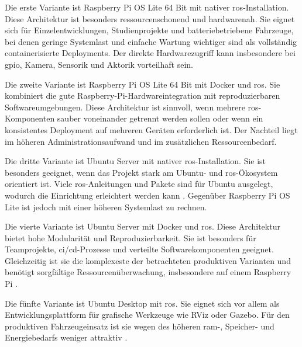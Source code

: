 Die erste Variante ist Raspberry Pi OS Lite 64 Bit mit nativer \gls{ros}-Installation. Diese Architektur ist besonders ressourcenschonend und hardwarenah. Sie eignet sich für Einzelentwicklungen, Studienprojekte und batteriebetriebene Fahrzeuge, bei denen geringe Systemlast und einfache Wartung wichtiger sind als vollständig containerisierte Deployments. Der direkte Hardwarezugriff kann insbesondere bei \gls{gpio}, Kamera, Sensorik und Aktorik vorteilhaft sein.

Die zweite Variante ist Raspberry Pi OS Lite 64 Bit mit Docker und \gls{ros}. Sie kombiniert die gute Raspberry-Pi-Hardwareintegration mit reproduzierbaren Softwareumgebungen. Diese Architektur ist sinnvoll, wenn mehrere \gls{ros}-Komponenten sauber voneinander getrennt werden sollen oder wenn ein konsistentes Deployment auf mehreren Geräten erforderlich ist. Der Nachteil liegt im höheren Administrationsaufwand und im zusätzlichen Ressourcenbedarf.

Die dritte Variante ist Ubuntu Server mit nativer \gls{ros}-Installation. Sie ist besonders geeignet, wenn das Projekt stark am Ubuntu- und \gls{ros}-Ökosystem orientiert ist. Viele \gls{ros}-Anleitungen und Pakete sind für Ubuntu ausgelegt, wodurch die Einrichtung erleichtert werden kann \cite{zotero-item-156}. Gegenüber Raspberry Pi OS Lite ist jedoch mit einer höheren Systemlast zu rechnen.

Die vierte Variante ist Ubuntu Server mit Docker und \gls{ros}. Diese Architektur bietet hohe Modularität und Reproduzierbarkeit. Sie ist besonders für Teamprojekte, \gls{ci/cd}-Prozesse und verteilte Softwarekomponenten geeignet. Gleichzeitig ist sie die komplexeste der betrachteten produktiven Varianten und benötigt sorgfältige Ressourcenüberwachung, insbesondere auf einem Raspberry Pi \cite{gamessPerformanceEvaluationDocker2023} \cite{zotero-item-163}.

Die fünfte Variante ist Ubuntu Desktop mit \gls{ros}. Sie eignet sich vor allem als Entwicklungsplattform für grafische Werkzeuge wie RViz oder Gazebo. Für den produktiven Fahrzeugeinsatz ist sie wegen des höheren \gls{ram}-, Speicher- und Energiebedarfs weniger attraktiv \cite{zotero-item-154}.

